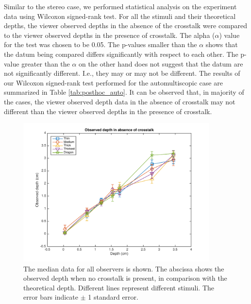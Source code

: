 Similar to the stereo case, we performed statistical analysis on the experiment data using Wilcoxon signed-rank test. For all the stimuli and their theoretical depths, the viewer observed depths in the absence of the crosstalk were compared to the viewer observed depths in the presence of crosstalk. The alpha ($\alpha$) value for the test was chosen to be 0.05. The p-values smaller than the $\alpha$ shows that the datum being compared differs significantly with respect to each other. The p-value greater than the $\alpha$ on the other hand does not suggest that the datum are not significantly different. I.e., they may or may not be different. The results of our Wilcoxon signed-rank test performed for the automultiscopic case are summarized in Table \ref{tab:posthoc_auto}. It can be observed that, in majority of the cases, the viewer observed depth data in the absence of crosstalk may not different than the viewer observed depths in the presence of crosstalk. 
\begin{figure}[H]
\centering
    \includegraphics[width=0.9\textwidth]{./Template_Figures/a_crosstalk_0}
    \caption{The median data for all observers is shown. The abscissa shows the observed depth when no crosstalk is present, in comparison with the theoretical depth. Different lines represent different stimuli. The error bars indicate $\pm$ 1 standard error.\label{fig:a_crosstalk_0}}
\end{figure}

